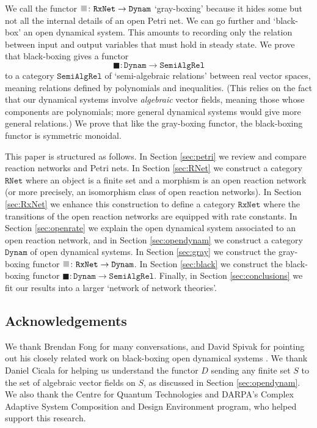 \documentclass{compositionalityarticle}
\newcommand{\RNet}{\mathtt{RNet}}
\newcommand{\RxNet}{\mathtt{RxNet}}
\newcommand{\Dynam}{\mathtt{Dynam}}
\newcommand{\SemiAlgRel}{\mathtt{SemiAlgRel}}
\newcommand*{\graysquare}{\textcolor{lightgray}{\blacksquare}}
\newcommand{\maps}{\colon}
\theoremstyle{plain}
\theoremstyle{remark}
\begin{document}
We call the functor $\graysquare \maps \RxNet \to \Dynam$ `gray-boxing' because it hides some but not all the internal details of an open Petri net.  We can go further and `black-box' an open dynamical system.  This amounts to recording only the relation between input and output variables that must hold in steady state.  We prove that black-boxing gives a functor 
\[        \blacksquare \maps \Dynam \to \SemiAlgRel \] 
to a category $\SemiAlgRel$ of `semi-algebraic relations' between real vector spaces, meaning relations defined by polynomials and inequalities.  (This relies on the fact that our dynamical systems involve \emph{algebraic} vector fields, meaning those whose components are polynomials; more general dynamical systems would give more general relations.)  We prove that like the gray-boxing functor, the black-boxing functor is symmetric monoidal.  

This paper is structured as follows. In Section \ref{sec:petri} we review and compare reaction networks and Petri nets.  In Section \ref{sec:RNet} we construct a category $\RNet$ where an object is a finite set and a morphism is an open reaction network (or more precisely, an isomorphism class of open reaction networks).   In Section \ref{sec:RxNet} we enhance this construction to define a category $\RxNet$ where the transitions of the open reaction networks are equipped with rate constants.   In Section \ref{sec:openrate} we explain the open dynamical system associated to an open reaction network, and in Section \ref{sec:opendynam} we construct a category $\Dynam$ of open dynamical systems. In Section \ref{sec:gray} we construct the gray-boxing functor $\graysquare \maps \RxNet \to \Dynam$.   In Section \ref{sec:black} we construct the black-boxing functor $\blacksquare \maps \Dynam \to \SemiAlgRel$.  Finally, in Section \ref{sec:conclusions} we fit our results into a larger `network of network theories'.

\subsection*{Acknowledgements}

We thank Brendan Fong for many conversations, and David Spivak for pointing out his closely related work on black-boxing open dynamical systems \cite{Spivak}. We thank Daniel Cicala for helping us understand the functor $D$ sending any finite set $S$ to the set of algebraic vector fields on $S$, as discussed in Section \ref{sec:opendynam}.  We also thank the Centre for Quantum Technologies and DARPA's Complex Adaptive System Composition and Design Environment program, who helped support this research.
\end{document}
